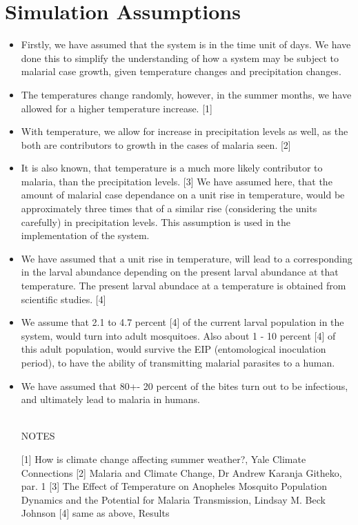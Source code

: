 \documentclass[fontsize=11pt]{article}
\begin{document}
    \section*{Simulation Assumptions}
    \begin{itemize}
        \item Firstly, we have assumed that the system is in the time unit of days. We have done this to simplify the understanding of how a system may be subject to malarial case growth, given temperature changes and precipitation changes.

        \item The temperatures change randomly, however, in the summer months, we have allowed for a higher temperature increase. [1]

        \item With temperature, we allow for increase in precipitation levels as well, as the both are contributors to growth in the cases of malaria seen. [2]

        \item It is also known, that temperature is a much more likely contributor to malaria, than the precipitation levels. [3] We have assumed here, that the amount of malarial case dependance on a unit rise in temperature, would be approximately three times that of a similar rise (considering the units carefully) in precipitation levels. This assumption is used in the implementation of the system.

        \item We have assumed that a unit rise in temperature, will lead to a corresponding in the larval abundance depending on the present larval abundance at that temperature. The present larval abundace at a temperature is obtained from scientific studies. [4]

        \item We assume that 2.1 to 4.7 percent [4] of the current larval population in the system, would turn into adult mosquitoes. Also about 1 - 10 percent [4] of this adult population, would survive the EIP (entomological inoculation period), to have the ability of transmitting malarial parasites to a human.

        \item We have assumed that 80+- 20 percent of the bites turn out to be infectious, and ultimately lead to malaria in humans.

        \\NOTES

        [1] How is climate change affecting summer weather?, Yale Climate Connections
        [2] Malaria and Climate Change, Dr Andrew Karanja Githeko, par. 1
        [3] The Effect of Temperature on Anopheles Mosquito Population Dynamics and the Potential for Malaria Transmission, Lindsay M. Beck Johnson
        [4] same as above, Results

    \end{itemize}
\end{document}
